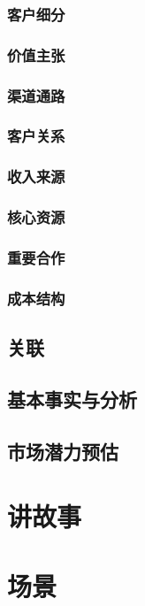 \documentclass[a4paper,12pt]{article}
\begin{document}
\subsubsection{客户细分}
\subsubsection{价值主张}
\subsubsection{渠道通路}
\subsubsection{客户关系}
\subsubsection{收入来源}
\subsubsection{核心资源}
\subsubsection{重要合作}
\subsubsection{成本结构}
\subsection{关联}
\subsection{基本事实与分析}
\subsection{市场潜力预估}
\section{讲故事}
\section{场景}
\end{document}
